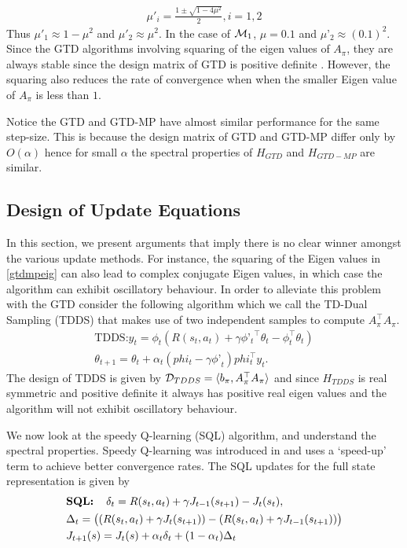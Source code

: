 \begin{align}\label{gtdmpeig}
\mu'_{i}=\frac{1\pm \sqrt{1-4\mu^2}}{2}, i=1,2
\end{align}
Thus $\mu'_1\approx 1-\mu^2$ and $\mu'_2\approx \mu^2$. In the case of $\mathcal{M}_1$, $\mu=0.1$ and $\mu’_2\approx (0.1)^2$. Since the GTD algorithms involving squaring of the eigen values of $A_\pi$, they are always stable since the design matrix of GTD is positive definite \cite{gtdref}. However, the squaring also reduces the rate of convergence when when the smaller Eigen value of $A_\pi$ is less than $1$.

Notice the GTD and GTD-MP have almost similar performance for the same step-size. This is because the design matrix of GTD and GTD-MP differ only by $O(\alpha)$ hence for small $\alpha$ the spectral properties of $H_{GTD}$ and $H_{GTD-MP}$ are similar.
\subsection{Design of Update Equations}\label{design}
In this section, we present arguments that imply there is no clear winner amongst the various update methods. For instance, the squaring of the Eigen values in \eqref{gtdmpeig} can also lead to complex conjugate Eigen values, in which case the algorithm can exhibit oscillatory behaviour. In order to alleviate this problem with the GTD consider the following algorithm which we call the TD-Dual Sampling (TDDS) that makes use of two independent samples to compute $A_\pi^\top A_\pi$.
\begin{align}\label{tdds}
\text{TDDS:} y_t=\phi_t(R(s_t,a_t)+\gamma{\phi’_t}^\top\theta_t-\phi_t^\top \theta_t)\\
\theta_{t+1}=\theta_t+\alpha_t(phi_t-\gamma{\phi’}_t)phi_t^\top y_t.
\end{align}  
The design of TDDS is given by $\mathcal{D}_{TDDS}=\langle b_\pi, A_\pi^\top A_\pi\rangle$ and since $H_{TDDS}$ is real symmetric and positive definite it always has positive real eigen values and the algorithm will not exhibit oscillatory behaviour.


We now look at the speedy Q-learning (SQL) algorithm, and understand the spectral properties. Speedy Q-learning was introduced in \cite{sqlpaper} and uses a `speed-up' term to achieve better convergence rates. The SQL updates for the full state representation is given by
\begin{align}\label{sql}
\begin{split}
&\textbf{SQL:\quad}\delta_t=R(s_t,a_t)+\gamma J_{t-1}(s_{t+1})-J_{t}(s_t),\\
&\Delta_t= \big((R(s_t,a_t)+\gamma J_t(s_{t+1}))-(R(s_t,a_t)+\gamma J_{t-1}(s_{t+1}))\big)\\&J_{t+1}(s)=J_t(s)+\alpha_t\delta_t+(1-\alpha_t)\Delta_t
\end{split}
\end{align}
